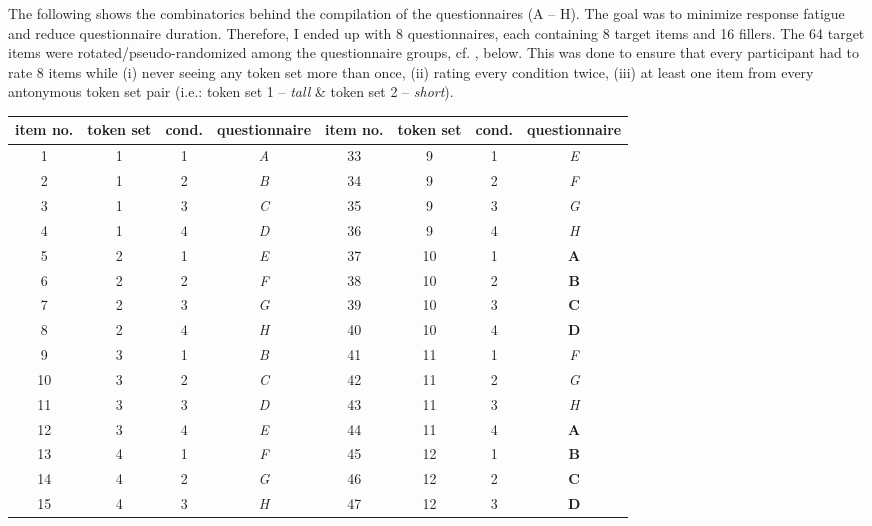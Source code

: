 \documentclass[output=paper,
modfonts
]{langscibook}
\begin{document}
\noindent The following shows the combinatorics behind the compilation of the questionnaires (A -- H). The goal was to minimize response fatigue and reduce questionnaire duration. Therefore, I ended up with 8 questionnaires, each containing 8 target items and 16 fillers. The 64 target items were rotated/pseudo-randomized among the questionnaire groups, cf. , below. This was done to ensure that every participant had to rate 8 items while (i) never seeing any token set more than once, (ii) rating every condition twice, (iii) at least one item from every antonymous token set pair (i.e.: token set 1 -- \textit{tall} \& token set 2 -- \textit{short}).

\begin{table}[H]\scriptsize
\begin{tabular}{cccc|cccc}
\lsptoprule
item no. & token set & cond. & \textbf{questionnaire} & item no. & token set & cond. & \textbf{questionnaire} \\
\midrule \midrule 
1  & 1 & 1 & \textit{A}     & 33 & 9 & 1 & \textit{E}\\
\midrule 
2  & 1 & 2 & \textit{B}     & 34 & 9 & 2 & \textit{F} \\
\midrule
3  & 1 & 3 & \textit{C}     & 35 & 9 & 3 & \textit{G} \\
\midrule
4  & 1 & 4 & \textit{D}     & 36 & 9 & 4 & \textit{H} \\
\midrule
5  & 2 & 1 & \textit{E}     & 37 & 10 & 1 & \textbf{A} \\
\midrule
6  & 2 & 2 & \textit{F}     & 38 & 10 & 2 & \textbf{B} \\
\midrule
7  & 2 & 3 & \textit{G}     & 39 & 10 & 3 & \textbf{C} \\
\midrule
8  & 2 & 4 & \textit{H}     & 40 & 10 & 4 & \textbf{D} \\
\midrule \midrule
9  & 3 & 1 & \textit{B}     & 41 & 11 & 1 & \textit{F} \\
\midrule
10  & 3 & 2 & \textit{C}    & 42 & 11 & 2 & \textit{G} \\
\midrule
11  & 3 & 3 & \textit{D}    & 43 & 11 & 3 & \textit{H} \\
\midrule
12  & 3 & 4 & \textit{E}    & 44 & 11 & 4 & \textbf{A} \\
\midrule
13  & 4 & 1 & \textit{F}    & 45 & 12 & 1 & \textbf{B} \\
\midrule
14  & 4 & 2 & \textit{G}    & 46 & 12 & 2 & \textbf{C} \\
\midrule
15  & 4 & 3 & \textit{H}    & 47 & 12 & 3 & \textbf{D} \\

\end{tabular}
\end{table}
\end{document}
